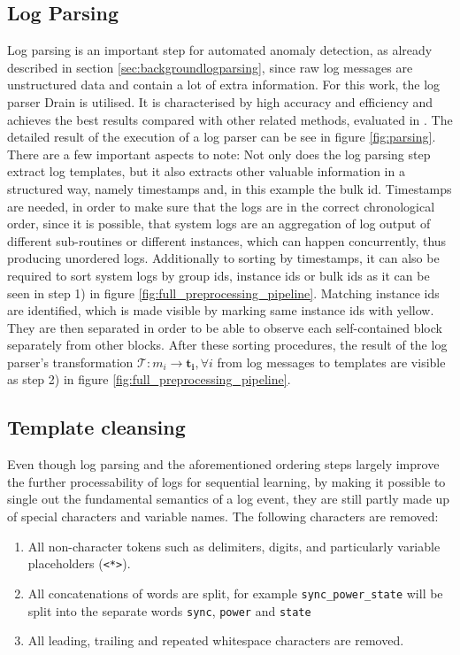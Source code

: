 \subsection{Log Parsing}\label{sec:conceptlogparsing}
Log parsing is an important step for automated anomaly detection, as already described in section \ref{sec:backgroundlogparsing}, since raw log messages are unstructured data and contain a lot of extra information. 
For this work, the log parser Drain \cite{he2017drain} is utilised. It is characterised by high accuracy and efficiency \cite{he2017drain} and achieves the best results compared with other related methods, evaluated in \cite{zhu2019tools}. The detailed result of the execution of a log parser can be see in figure \ref{fig:parsing}. 
There are a few important aspects to note: Not only does the log parsing step extract log templates, but it also extracts other valuable information in a structured way, namely timestamps and, in this example the bulk id. Timestamps are needed, in order to make sure that the logs are in the correct chronological order, since it is possible, that system logs are an aggregation of log output of different sub-routines or different instances, which can happen concurrently, thus producing unordered logs. Additionally to sorting by timestamps, it can also be required to sort system logs by group ids, instance ids or bulk ids as it can be seen in step 1) in figure \ref{fig:full_preprocessing_pipeline}. Matching instance ids are identified, which is made visible by marking same instance ids with yellow. They are then separated in order to be able to observe each self-contained block separately from other blocks. After these sorting procedures, the result of the log parser's transformation $\mathcal{T}: m_i \to \mathbf{t_i}, \forall i$ from log messages to templates are visible as step 2) in figure \ref{fig:full_preprocessing_pipeline}.

\subsection{Template cleansing \label{sec:template_cleansing}}
Even though log parsing and the aforementioned ordering steps largely improve the further processability of logs for sequential learning, by making it possible to single out the fundamental semantics of a log event, they are still partly made up of special characters and variable names. The following characters are removed:
\begin{enumerate}
	\item All non-character tokens such as delimiters, digits, and particularly variable placeholders (\verb!<*>!).
	\item All concatenations of words are split, for example \verb!sync_power_state! will be split into the separate words \verb!sync!, \verb!power! and \verb!state!
	\item All leading, trailing and repeated whitespace characters are removed.
\end{enumerate}

